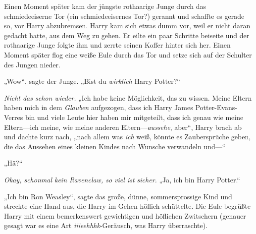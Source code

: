 Einen Moment später kam der jüngste rothaarige Junge durch das schmiedeeiserne Tor (ein schmiedeeisernes Tor?) gerannt und schaffte es gerade so, vor Harry abzubremsen. Harry kam sich etwas dumm vor, weil er nicht daran gedacht hatte, aus dem Weg zu gehen. Er eilte ein paar Schritte beiseite und der rothaarige Junge folgte ihm und zerrte seinen Koffer hinter sich her. Einen Moment später flog eine weiße Eule durch das Tor und setze sich auf der Schulter des Jungen nieder.

„Wow“, sagte der Junge. „Bist du \emph{wirklich} Harry Potter?“

\emph{Nicht das schon wieder.} „Ich habe keine Möglichkeit, das zu wissen. Meine Eltern haben mich in dem \emph{Glauben} aufgezogen, dass ich Harry James Potter-Evans-Verres bin und viele Leute hier haben mir mitgeteilt, dass ich genau wie meine Eltern—ich meine, wie meine anderen Eltern—\emph{aussehe}, aber“, Harry brach ab und dachte kurz nach, „nach allem was \emph{ich} weiß, könnte es Zaubersprüche geben, die das Aussehen eines kleinen Kindes nach Wunsche verwandeln und—“

„Hä?“

\emph{Okay, schonmal kein Ravenclaw, so viel ist sicher.} „Ja, ich bin Harry Potter.“

„Ich bin Ron Weasley“, sagte das große, dünne, sommersprossige Kind und streckte eine Hand aus, die Harry im Gehen höflich schüttelte. Die Eule begrüßte Harry mit einem bemerkenswert gewichtigen und höflichen Zwitschern (genauer gesagt war es eine Art \emph{iiieehhhk}-Geräusch, was Harry überraschte).

